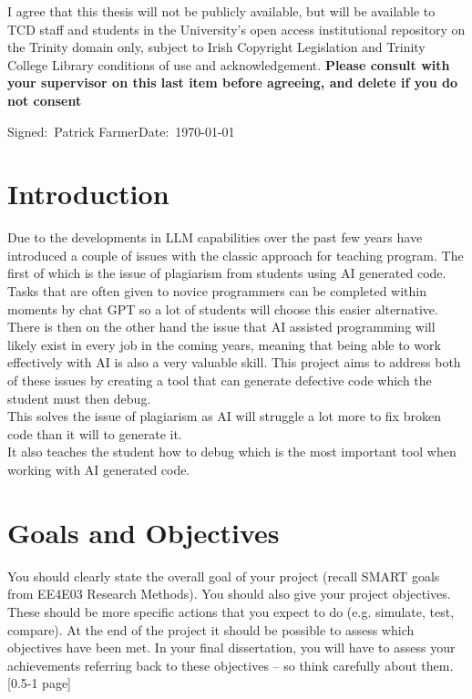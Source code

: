 \documentclass[12pt]{extarticle}
\begin{document}
\small I agree that this thesis will not be publicly available, but will be available to TCD staff and students in the University’s open access institutional repository on the Trinity domain only, subject to Irish Copyright Legislation and Trinity College Library conditions of use and acknowledgement.  \textbf{Please consult with your supervisor on this last item before agreeing, and delete if you do not consent}
\vspace{2cm}

\small Signed:~Patrick Farmer\hfill Date:~\today

\newpage
\tableofcontents

\newpage
\section{Introduction}

Due to the developments in LLM capabilities over the past few years have introduced a couple of issues with the classic approach for teaching program. The first of which is the issue of plagiarism from students using AI generated code. Tasks that are often given to novice programmers can be completed within moments by chat GPT so a lot of students will choose this easier alternative.\\
There is then on the other hand the issue that AI assisted programming will likely exist in every job in the coming years, meaning that being able to work effectively with AI is also a very valuable skill. This project aims to address both of these issues by creating a tool that can generate defective code which the student must then debug.\\
This solves the issue of plagiarism as AI will struggle a lot more to fix broken code than it will to generate it.\\
It also teaches the student how to debug which is the most important tool when working with AI generated code.

\newpage
\section{Goals and Objectives}

You should clearly state the overall goal of your project (recall SMART goals from  EE4E03 Research Methods). You should also give your project objectives. These should be more specific actions that you expect to do (e.g. simulate, test, compare). At the end of the project it should be possible to assess which objectives have been met. In your final dissertation, you will have to assess your achievements referring back to these objectives – so think carefully about them. [0.5-1 page] 
\end{document}
